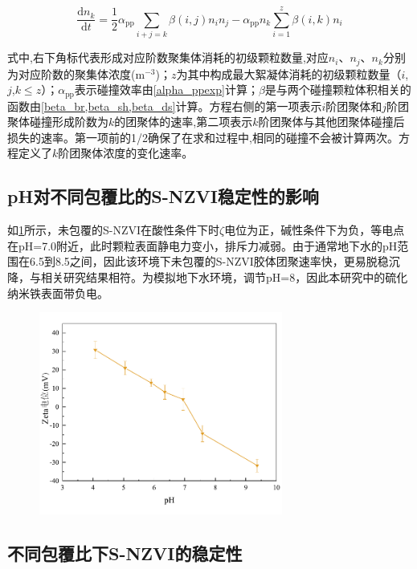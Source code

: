 \begin{equation}\label{smoluchowski}
    \frac{\mathrm{d}n_k}{\mathrm{d}t}=\frac{1}{2}\alpha_\mathrm{pp}\sum_{i+j=k}{\beta(i,j)n_in_j}-\alpha_\mathrm{pp} n_k\sum_{i=1}^{z}{\beta(i,k)n_i}
\end{equation}

式中,右下角标代表形成对应阶数聚集体消耗的初级颗粒数量,对应$n_i$、$n_j$、$n_k$分别为对应阶数的聚集体浓度($\mathrm{m^{-3}}$)；$z$为其中构成最大絮凝体消耗的初级颗粒数量（$i$,$j$,$k\leq z$）；$\alpha_\mathrm{pp}$表示碰撞效率由\cref{alpha_ppexp}计算；$\beta$是与两个碰撞颗粒体积相关的函数由\cref{beta_br,beta_sh,beta_ds}计算。方程右侧的第一项表示$i$阶团聚体和$j$阶团聚体碰撞形成阶数为$k$的团聚体的速率,第二项表示$k$阶团聚体与其他团聚体碰撞后损失的速率。第一项前的1/2确保了在求和过程中,相同的碰撞不会被计算两次。方程定义了$k$阶团聚体浓度的变化速率。


\subsection{pH对不同包覆比的S-NZVI稳定性的影响}

如\cref{fig3}所示，未包覆的S-NZVI在酸性条件下时$\zeta$电位为正，碱性条件下为负，等电点在pH=7.0附近，此时颗粒表面静电力变小，排斥力减弱。由于通常地下水的pH范围在6.5到8.5之间\cite{dixiashuibiaozhun}，因此该环境下未包覆的S-NZVI胶体团聚速率快，更易脱稳沉降，与相关研究结果相符。为模拟地下水环境，调节pH=8，因此本研究中的硫化纳米铁表面带负电。

\begin{figure}[h]
    \centering
    \includegraphics[width=8cm]{figs/fig3.pdf}
    \label{fig3}
\end{figure}

\subsection{不同包覆比下S-NZVI的稳定性}

